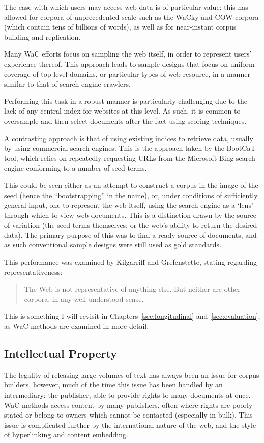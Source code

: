 The ease with which users may access web data is of particular value: this has allowed for corpora of unprecedented scale such as the WaCky\cite{baroni2009wacky} and COW\cite{schafer2012building} corpora (which contain tens of billions of words), as well as for near-instant corpus building and replication.

Many WaC efforts focus on sampling the web itself, in order to represent users' experience thereof.  This approach leads to sample designs that focus on uniform coverage of top-level domains, or particular types of web resource, in a manner similar to that of search engine crawlers.

Performing this task in a robust manner is particularly challenging due to the lack of any central index for websites at this level.  As such, it is common to oversample and then select documents after-the-fact using scoring techniques\cite{schafer2013web,schafer2014focused}.

A contrasting approach is that of using existing indices to retrieve data, usually by using commercial search engines.  This is the approach taken by the BootCaT tool, which relies on repeatedly requesting URLs from the Microsoft Bing search engine conforming to a number of seed terms.

This could be seen either as an attempt to construct a corpus in the image of the seed (hence the ``bootstrapping'' in the name), or, under conditions of sufficiently general input, one to represent the web itself, using the search engine as a `lens' through which to view web documents.  This is a distinction drawn by the source of variation (the seed terms themselves, or the web's ability to return the desired data).  The primary purpose of this was to find a ready source of documents, and as such conventional sample designs were still used as gold standards.

This performance was examined by Kilgarriff and Grefenstette\cite[p. 343]{kilgarriff2003introduction}, stating regarding representativeness:

\begin{quote}
The Web is not representative of anything else. But neither are other corpora, in any
well-understood sense.
\end{quote}

This is something I will revisit in Chapters~\ref{sec:longitudinal} and~\ref{sec:evaluation}, as WaC methods are examined in more detail.


\subsection{Intellectual Property}
The legality of releasing large volumes of text has always been an issue for corpus builders, however, much of the time this issue has been handled by an intermediary: the publisher, able to provide rights to many documents at once.  WaC methods access content by many publishers, often where rights are poorly-stated or belong to owners which cannot be contacted (especially in bulk).  This issue is complicated further by the international nature of the web, and the style of hyperlinking and content embedding\cite{hemming2010copyright}.  

